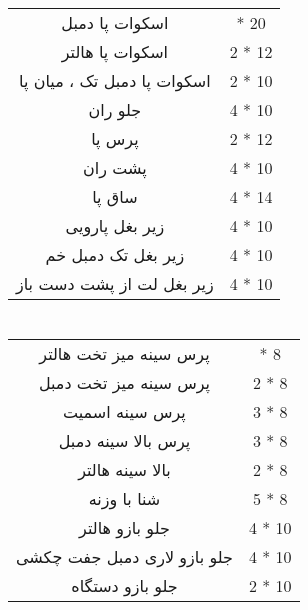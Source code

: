 \documentclass[12pt]{article}
\newcommand\myPadding{1.5}
\begin{document}
\begin{center}
  \bgroup
  \def\arraystretch{\myPadding}%
  \begin{tabular}{ c  c  }
اسکوات پا دمبل &
 { \quad 1 * 20 \quad } \\
اسکوات پا هالتر &
 2 * 12 \\
اسکوات پا دمبل تک ، میان پا &
 2 * 10 \\
جلو ران &
 4 * 10 \\
پرس پا &
 2 * 12 \\
پشت ران &
 4 * 10 \\
ساق پا &
 4 * 14 \\
زیر بغل پارویی &
 4 * 10 \\
زیر بغل تک دمبل خم &
 4 * 10 \\ 
 زیر بغل لت از پشت دست باز &
 4 * 10 \\ 
  \end{tabular}
  \egroup
\end{center}


\newpage
\section{}



\begin{center}
  \bgroup
  \def\arraystretch{\myPadding}%
  \begin{tabular}{ c  c  }
پرس سینه میز تخت هالتر &
 { \quad 3 * 8 \quad } \\
پرس سینه میز تخت دمبل &
 2 * 8 \\
پرس سینه اسمیت &
 3 * 8 \\
پرس بالا سینه دمبل &
 3 * 8 \\
بالا سینه هالتر &
 2 * 8 \\
شنا با وزنه &
 5 * 8 \\
جلو بازو هالتر &
 4 * 10 \\
جلو بازو لاری دمبل جفت چکشی &
 4 * 10 \\
جلو بازو دستگاه &
 2 * 10 \\ 
  \end{tabular}
  \egroup
\end{center}




\section{}
\end{document}
